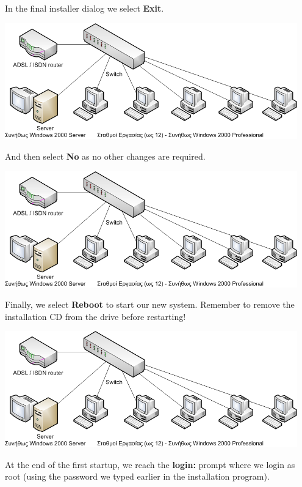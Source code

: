\documentclass[a4paper,twoside,12pt]{article}
\begin{document}
In the final installer dialog we select \textbf{Exit}.

\begin{center}
\includegraphics[width=0.95\textwidth]{images/main/school-lab}
\end{center}

And then select \textbf{No} as no other changes are required.

\begin{center}
\includegraphics[width=0.95\textwidth]{images/main/school-lab}
\end{center}

Finally, we select \textbf{Reboot} to start our new system. Remember to remove the installation CD from the drive before restarting!

\begin{center}
\includegraphics[width=0.95\textwidth]{images/main/school-lab}
\end{center}

At the end of the first startup, we reach the \textbf{login:} prompt where we login as root (using the password we typed earlier in the installation program).
\end{document}
